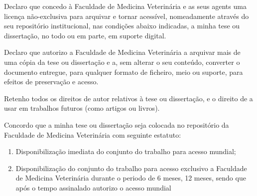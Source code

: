 Declaro que concedo à Faculdade de Medicina Veterinária e as seus agents uma licença não-exclusiva para arquivar e
tornar acessível, nomeadamente através do seu repositório institucional, nas condições abaixo indicadas, a minha tese ou
dissertação, no todo ou em parte, em suporte digital.

Declaro que autorizo a Faculdade de Medicina Veterinária a arquivar mais de uma cópia da tese ou dissertação e a, sem
alterar o seu conteúdo, converter o documento entregue, para qualquer formato de ficheiro, meio ou suporte, para efeitos
de preservação e acesso.

Retenho todos os direitos de autor relativos à tese ou dissertação, e o direito de a usar em trabalhos futuros (como artigos ou livros).

Concordo que a minha tese ou dissertação seja colocada no repositório da Faculdade de Medicina Veterinária com
seguinte estatuto:
\begin{enumerate}
  \item {} 
        Disponibilização imediata do conjunto do trabalho para acesso mundial;
  \item {}
        Disponibilização do conjunto do trabalho para acesso exclusivo a Faculdade de Medicina Veterinária durante
o periodo de 
6 meses, 
12 meses, sendo que após o tempo assinalado autorizo o acesso mundial%
\end{enumerate}

